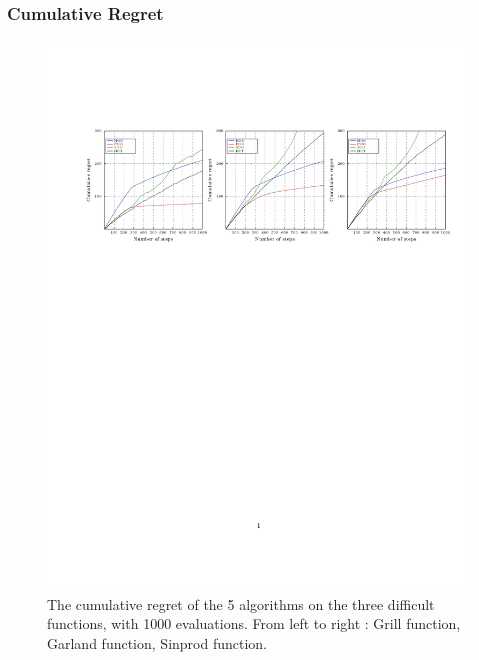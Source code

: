 \documentclass[xcolor={usenames,dvipsnames}]{beamer}
\begin{document}
\begin{frame}
\frametitle{Cumulative Regret}
\vfill
\begin{figure}
	\includegraphics[trim={2cm 6cm 0 4cm},clip,scale = 0.65]{cumulative1000.pdf}
\vspace{-8.25cm}
\caption{\label{fig:cumulative1000}The cumulative regret of the 5 algorithms on the three difficult functions, with 1000 evaluations. From left to right : Grill function, Garland function, Sinprod function.}
\end{figure}
\end{frame}
\end{document}
